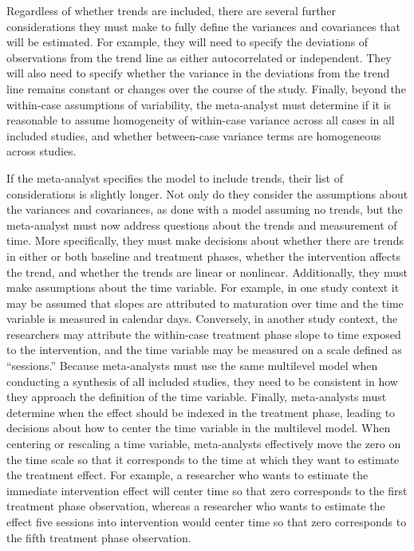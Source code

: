 \documentclass[
]{book}
\begin{document}
Regardless of whether trends are included, there are several further considerations they must make to fully define the variances and covariances that will be estimated.
For example, they will need to specify the deviations of observations from the trend line as either autocorrelated or independent.
They will also need to specify whether the variance in the deviations from the trend line remains constant or changes over the course of the study.
Finally, beyond the within-case assumptions of variability, the meta-analyst must determine if it is reasonable to assume homogeneity of within-case variance across all cases in all included studies, and whether between-case variance terms are homogeneous across studies.

If the meta-analyst specifies the model to include trends, their list of considerations is slightly longer.
Not only do they consider the assumptions about the variances and covariances, as done with a model assuming no trends, but the meta-analyst must now address questions about the trends and measurement of time.
More specifically, they must make decisions about whether there are trends in either or both baseline and treatment phases, whether the intervention affects the trend, and whether the trends are linear or nonlinear.
Additionally, they must make assumptions about the time variable.
For example, in one study context it may be assumed that slopes are attributed to maturation over time and the time variable is measured in calendar days.
Conversely, in another study context, the researchers may attribute the within-case treatment phase slope to time exposed to the intervention, and the time variable may be measured on a scale defined as ``sessions.''
Because meta-analysts must use the same multilevel model when conducting a synthesis of all included studies, they need to be consistent in how they approach the definition of the time variable.
Finally, meta-analysts must determine when the effect should be indexed in the treatment phase, leading to decisions about how to center the time variable in the multilevel model.
When centering or rescaling a time variable, meta-analysts effectively move the zero on the time scale so that it corresponds to the time at which they want to estimate the treatment effect.
For example, a researcher who wants to estimate the immediate intervention effect will center time so that zero corresponds to the first treatment phase observation, whereas a researcher who wants to estimate the effect five sessions into intervention would center time so that zero corresponds to the fifth treatment phase observation.
\end{document}
